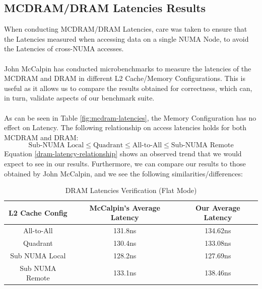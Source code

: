 \documentclass[bsc,frontabs,twoside,singlespacing,parskip,deptreport]{infthesis}     %
\begin{document}
\subsection{MCDRAM/DRAM Latencies Results}
When conducting MCDRAM/DRAM Latencies, care was taken to ensure that the Latencies measured when accessing data on a single NUMA Node, to avoid the Latencies of cross-NUMA accesses. \\
\\
John McCalpin has conducted microbenchmarks to measure the latencies of the MCDRAM and DRAM in different L2 Cache/Memory Configurations\cite{mccalpin_results}. This is useful as it allows us to compare the results obtained for correctness, which can, in turn, validate aspects of our benchmark suite. \\
\\
As can be seen in Table \ref{fig:mcdram-latencies}, the Memory Configuration has no effect on Latency. The following relationship on access latencies holds for both MCDRAM and DRAM:
\begin{equation}\label{dram-latency-relationship}
\textrm{Sub-NUMA Local} \leq \textrm{Quadrant} \leq \textrm{All-to-All} \leq \textrm{Sub-NUMA Remote}
\end{equation}
Equation \ref{dram-latency-relationship} shows an observed trend that we would expect to see in our results. Furthermore, we can compare our results to those obtained by John McCalpin, and we see the following similarities/differences:

\begin{table}[!h]
\begin{center}
\caption{DRAM Latencies Verification (Flat Mode)}
\label{fig:dram-latencies-verification}
\begin{tabular}{ |c|c|c| } 
    \hline
    L2 Cache Config & McCalpin's Average Latency & Our Average Latency \\
    \hline
    All-to-All      & 131.8ns  & 134.62ns \\
    Quadrant        & 130.4ns  & 133.08ns \\
    Sub NUMA Local  & 128.2ns  & 127.69ns \\
    Sub NUMA Remote & 133.1ns  & 138.46ns \\
    \hline
\end{tabular}
\end{center}
\end{table}
\end{document}
